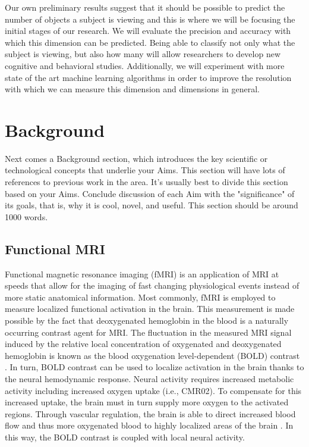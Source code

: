\documentclass[12pt]{article}
\begin{document}
Our own preliminary results suggest that it should be possible to predict the number of objects a subject is viewing and this is where we will be focusing the initial stages of our research.
We will evaluate the precision and accuracy with which this dimension can be predicted.
Being able to classify not only what the subject is viewing, but also how many will allow researchers to develop new cognitive and behavioral studies. 
Additionally, we will experiment with more state of the art machine learning algorithms in order to improve the resolution with which we can measure this dimension and dimensions in general.

\section{Background}
Next comes a Background section, which introduces the key scientific or technological concepts that underlie your Aims. 
This section will have lots of references to previous work in the area. 
It's usually best to divide this section based on your Aims. 
Conclude discussion of each Aim with the "significance" of its goals, that is, why it is cool, novel, and useful. 
This section should be around 1000 words.

\subsection{Functional MRI}
Functional magnetic resonance imaging (fMRI) is an application of MRI at speeds that allow for the imaging of fast changing physiological events instead of more static anatomical information.
Most commonly, fMRI is employed to measure localized functional activation in the brain.
This measurement is made possible by the fact that deoxygenated hemoglobin in the blood is a naturally occurring contrast agent for MRI.
The fluctuation in the measured MRI signal induced by the relative local concentration of oxygenated and deoxygenated hemoglobin is known as the blood oxygenation level-dependent (BOLD) contrast \cite{Ogawa1990}.
In turn, BOLD contrast can be used to localize activation in the brain thanks to the neural hemodynamic response.
Neural activity requires increased metabolic activity including increased oxygen uptake (i.e., CMR02).
To compensate for this increased uptake, the brain must in turn supply more oxygen to the activated regions.
Through vascular regulation, the brain is able to direct increased blood flow and thus more oxygenated blood to highly localized areas of the brain \cite{Buxton2004}.
In this way, the BOLD contrast is coupled with local neural activity.
\end{document}
